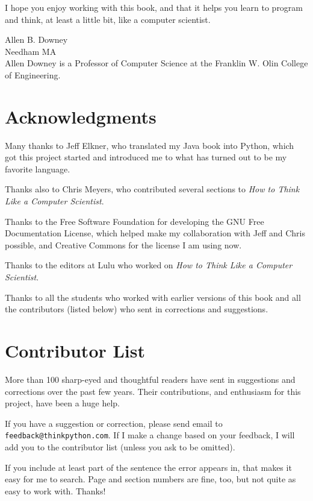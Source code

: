 \documentclass[10pt]{book}
\begin{document}
I hope you enjoy working with this book, and that it helps
you learn to program and think, at least a little bit, like
a computer scientist.


Allen B. Downey \\
Needham MA\\

Allen Downey is a Professor of Computer Science at 
the Franklin W. Olin College of Engineering.


\section*{Acknowledgments}

Many thanks to Jeff Elkner, who
translated my Java book into Python, which got this project
started and introduced me to what has turned out to be my
favorite language.

Thanks also to Chris Meyers, who contributed several sections
to {\em How to Think Like a Computer Scientist}.

Thanks to the Free Software Foundation for developing
the GNU Free Documentation License, which helped make
my collaboration with Jeff and Chris possible, and Creative
Commons for the license I am using now.

Thanks to the editors at Lulu who worked on
{\em How to Think Like a Computer Scientist}.

Thanks to all the students who worked with earlier
versions of this book and all the contributors (listed
below) who sent in corrections and suggestions.


\section*{Contributor List}

More than 100 sharp-eyed and thoughtful readers have sent in
suggestions and corrections over the past few years.  Their
contributions, and enthusiasm for this project, have been a
huge help.

If you have a suggestion or correction, please send email to 
{\tt feedback@thinkpython.com}.  If I make a change based on your
feedback, I will add you to the contributor list
(unless you ask to be omitted).

If you include at least part of the sentence the
error appears in, that makes it easy for me to search.  Page and
section numbers are fine, too, but not quite as easy to work with.
Thanks!
\end{document}
